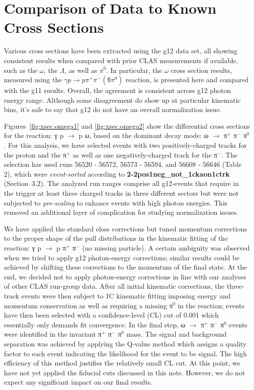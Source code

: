 \section{\label{sec:xsec}Comparison of Data to Known Cross Sections}

Various cross sections have been extracted using the g12 data set, all showing consistent results when compared with prior CLAS measurements if available, such as the $\omega$, the $\Lambda$, as well as $\pi^0$. In particular, the $\omega$ cross section results, measured using the $\gamma p \rightarrow p \pi^+ \pi^- (\$\pi^0)$ reaction, is presented here and compared with the g11 results. Overall, the agreement is consistent across g12 photon energy range. Although some disagreement do show up at particular kinematic bins, it's safe to say that g12 do not have an overall normalization issue. 

Figures~\ref{fig:xsec.omega1} and \ref{fig:xsec.omega2} show the differential cross sections for the reaction: γ p $\rightarrow$ p ω, based on the dominant decay mode: ω $\rightarrow$ π$^+$ π$^-$ π$^0$. For this analysis, we have selected events with two positively-charged tracks for the proton and the π$^+$ as well as one negatively-charged track for the π$^-$. The selection has used runs 56520 - 56572, 56573 - 56594, and 56608 - 56646 (Table 2), which were {\it event-sorted} according to {\bf 2-2pos1neg\_not\_1ckaon1ctrk} (Section~3.2). The analyzed run ranges comprise all g12-events that require in the trigger at least three charged tracks in three different sectors but were not subjected to {\it pre-scaling} to enhance events with high photon energies. This removed an additional layer of complication for studying normalization issues.

We have applied the standard {\sc eloss} corrections but tuned momentum corrections to the proper shape of the pull distributions in the kinematic fitting of the reaction: γ p $\rightarrow$ p π$^+$ π$^-$ (no missing particle). A certain ambiguity was observed when we tried to apply g12 photon-energy corrections; similar results could be achieved by shifting these corrections to the momentum of the final state. At the end, we decided not to apply photon-energy corrections in line with our analyses of other CLAS run-group data. After all initial kinematic corrections, the three-track events were then subject to 1C kinematic fitting imposing energy and momentum conservation as well as requiring a missing π$^0$ in the reaction; events have then been selected with a confidence-level (CL) cut of 0.001 which essentially only demands fit convergence. In the final step, ω $\rightarrow$ π$^+$ π$^-$ π$^0$ events were identified in the invariant π$^+$ π$^-$ π$^0$ mass. The signal and background separation was achieved by applying the Q-value method which assigns a quality factor to each event indicating the likelihood for the event to be signal. The high efficiency of this method justifies the relatively small CL cut. At this point, we have not yet applied the fiducial cuts discussed in this note. However, we do not expect any significant impact on our final results.

